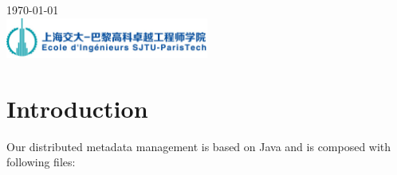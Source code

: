\documentclass[10pt]{article}
\begin{document}
\begin{titlepage}


{\large \today}\\[2cm] %


\includegraphics[width=0.5\textwidth]{logo_SPEIT.jpg}\\[1cm] %


\vfill %

\end{titlepage}
\indent

\section{Introduction}

Our distributed metadata management is based on Java and is composed with following files:
\end{document}
